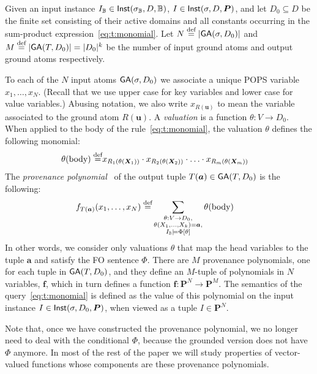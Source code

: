 
Given an input instance $I_\mathbb B \in \textsf{Inst}(\sigma_\mathbb B, D, \mathbb B)$,
$I \in \textsf{Inst}(\sigma, D, \bm P)$, and let $D_0 \subseteq D$ be the
finite set consisting of their active domains and all constants
occurring in the sum-product expression~\eqref{eq:t:monomial}.  Let
$N \stackrel{\text{def}}{=} |\textsf{GA}(\sigma, D_0)|$ and
$M \stackrel{\text{def}}{=} |\textsf{GA}(T,D_0)| = |D_0|^k$ be the number of input ground
atoms and output ground atoms respectively.

To each of the $N$ input atoms $\textsf{GA}(\sigma,D_0)$ we associate a unique POPS variable
$x_1, \ldots, x_N$. (Recall that we use upper case for key variables and
lower case for value variables.)
Abusing notation, we also write $x_{R(\bm u)}$ to mean the variable associated to the ground
atom $R(\bm u)$.
A {\em valuation} is a function $\theta : V \rightarrow D_0$.
When applied to the body of the rule~\eqref{eq:t:monomial}, the valuation $\theta$ defines the
following monomial:
%
\begin{align}
  \theta(\text{body}) \stackrel{\text{def}}{=} & x_{R_1(\theta(\bm X_1))}\cdot x_{R_2(\theta(\bm X_2))} \cdot \ldots \cdot x_{R_m(\theta(\bm X_m))} \label{eq:grounding:monomial}
\end{align}
%
The {\em provenance polynomial}~\cite{DBLP:conf/pods/GreenKT07} of the output tuple
$T(\bm a) \in \textsf{GA}(T,D_0)$ is the following:
%
\begin{align}
  f_{T(\bm a)}(x_1, \ldots, x_N) \stackrel{\text{def}}{=} &
  \sum_{\substack{\theta: V \rightarrow D_0, \\ \theta(X_1,\ldots,X_k)=\bm a, \\ I_\mathbb B \models
  \Phi[\theta]}} \theta(\text{body}) \label{eq:grounding:polynomial}
\end{align}
%
In other words, we consider only valuations $\theta$ that map the head
variables to the tuple $\bm a$ and satisfy the FO sentence $\Phi$.
There are $M$ provenance polynomials, one for each tuple in
$\textsf{GA}(T,D_0)$, and they define an $M$-tuple of polynomials in $N$
variables, $\bm f$, which in turn defines a function
$\bm f : \bm P^N \rightarrow \bm P^M$.  The semantics of the
query~\eqref{eq:t:monomial} is defined as the value of this polynomial
on the input instance $I \in \textsf{Inst}(\sigma, D_0, \bm P)$, when viewed
as a tuple $I \in \bm P^N$.

Note that, once we have constructed the provenance polynomial, we no longer need to deal with the
conditional $\Phi$, because the grounded version does not have $\Phi$ anymore.
In most of the rest of the paper we will study properties of vector-valued
functions whose components are these provenance polynomials.

